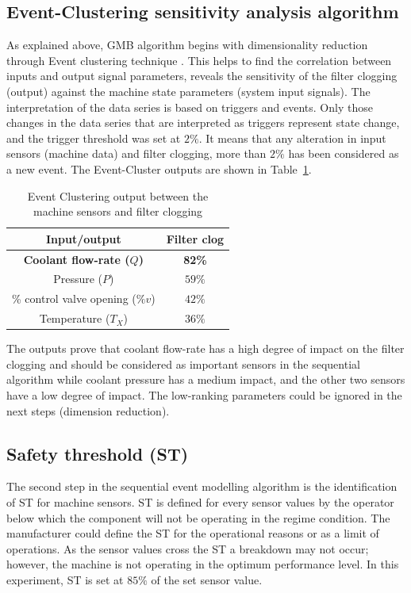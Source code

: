 \documentclass[conference]{IEEEtran}
\begin{document}
\subsection{Event-Clustering sensitivity analysis algorithm}
\label{subsec:event_clustering}
As explained above, GMB algorithm begins with dimensionality reduction through Event clustering technique \cite{Danishvar2018}. This helps to find the correlation between inputs and output signal parameters, reveals the sensitivity of the filter clogging (output) against the machine state parameters (system input signals). The interpretation of the data series is based on triggers and events. Only those changes in the data series that are interpreted as triggers represent state change, and the trigger threshold was set at $2\%$.   It means that any alteration in input sensors (machine data) and filter clogging, more than $2\%$ has been considered as a new event. The Event-Cluster outputs are shown in Table~\ref{tab:I}.
\begin{table}[htbp]
    \caption{Event Clustering output between the machine sensors and filter clogging}
    \begin{center}
        \begin{tabular}{|c|c|}
            \hline
            \textbf{Input/output}& \textbf{Filter clog} \\
            \hline
            \textbf{Coolant flow-rate ($Q$)} & \textbf{82\%}  \\
            \hline
            Pressure ($P$) & $59\%$ \\
            \hline
            \% control valve opening ($\%v$) & $42\%$ \\
            \hline
            Temperature ($T_X$) & $36\%$ \\
            \hline
        \end{tabular}
        \label{tab:I}
    \end{center}
\end{table}
The outputs prove that coolant flow-rate has a high degree of impact on the filter clogging and should be considered as important sensors in the sequential algorithm while coolant pressure has a medium impact, and the other two sensors have a low degree of impact. The low-ranking parameters could be ignored in the next steps (dimension reduction). 

\subsection{Safety threshold (ST)}
\label{subsec:ST}
The second step in the sequential event modelling algorithm is the identification of ST for machine sensors. ST is defined for every sensor values by the operator below which the component will not be operating in the regime condition. The manufacturer could define the ST for the operational reasons or as a limit of operations. As the sensor values cross the ST a breakdown may not occur; however, the machine is not operating in the optimum performance level. In this experiment, ST is set at $85\%$ of the set sensor value.
\end{document}
